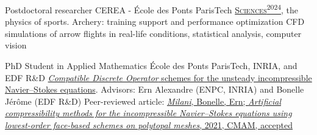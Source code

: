\documentclass[english]{RMcv}
\begin{document}






%
%


%
        {Postdoctoral researcher}%
        {CEREA - \'Ecole des Ponts ParisTech}%
        {\href{https://sciences2024.polytechnique.fr/}{\textsc{Sciences}\textsuperscript{2024}}, the physics of sports. Archery: training support and performance optimization}%
        {CFD simulations of arrow flights in real-life conditions, statistical analysis, computer vision}

%
        {PhD Student in Applied Mathematics}%
        {\'Ecole des Ponts ParisTech, INRIA, and EDF R\&D}%
        {\href{https://tel.archives-ouvertes.fr/tel-03080530}{\emph{Compatible Discrete Operator} schemes for the unsteady incompressible Navier–Stokes equations}. Advisors: Ern Alexandre (ENPC, INRIA) and Bonelle J\'er\^ome (EDF R\&D)}%
        {Peer-reviewed article: \href{https://www.degruyter.com/document/doi/10.1515/cmam-2021-0089/html}{\emph{Milani}, Bonelle, Ern; \emph{Artificial compressibility methods for the incompressible Navier--Stokes equations using lowest-order face-based schemes on polytopal meshes}, 2021, CMAM, accepted}}
\end{document}
